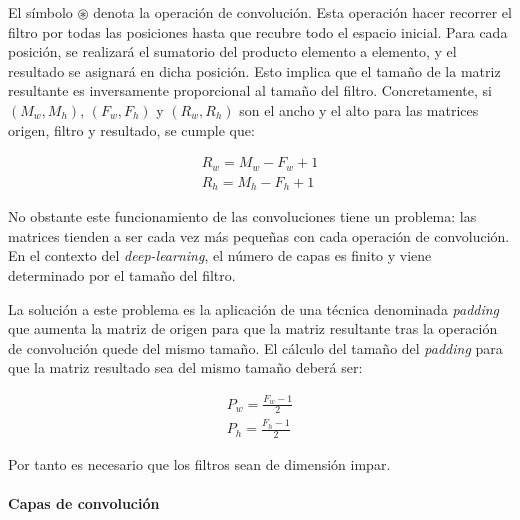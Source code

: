 El símbolo $\circledast$ denota la operación de convolución. Esta operación hacer recorrer el filtro por todas las posiciones hasta que recubre todo el espacio inicial. Para cada posición, se realizará el sumatorio del producto elemento a elemento, y el resultado se asignará en dicha posición. Esto implica que el tamaño de la matriz resultante es inversamente proporcional al tamaño del filtro. Concretamente, si $(M_w, M_h)$, $(F_w, F_h)$ y $(R_w, R_h)$ son el ancho y el alto para las matrices origen, filtro y resultado, se cumple que:

\begin{align}
	R_w = M_w - F_w + 1 \\
	R_h = M_h - F_h + 1
	\label{eq:convolve-result-sizes-basic}
\end{align}

No obstante este funcionamiento de las convoluciones tiene un problema: las matrices tienden a ser cada vez más pequeñas con cada operación de convolución. En el contexto del \textit{deep-learning}, el número de capas es finito y viene determinado por el tamaño del filtro.

La solución a este problema es la aplicación de una técnica denominada \textit{padding} que aumenta la matriz de origen para que la matriz resultante tras la operación de convolución quede del mismo tamaño. El cálculo del tamaño del \textit{padding} para que la matriz resultado sea del mismo tamaño deberá ser:

\begin{align}
	P_w = \frac{F_w - 1}{2} \\
	P_h = \frac{F_h - 1}{2} 
	\label{eq:convolve-filter-padding-dims}
\end{align}

Por tanto es necesario que los filtros sean de dimensión impar.

\paragraph{Capas de convolución}

